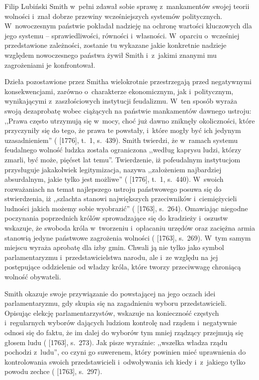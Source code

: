 \begin{artplenv}{Filip Lubiński}
Smith w~pełni zdawał sobie sprawę z~mankamentów swojej teorii wolności i~znał dobrze przewiny wcześniejszych
systemów politycznych. W~nowoczesnym państwie pokładał nadzieję na ochronę wartości kluczowych dla jego
systemu -- sprawiedliwości, równości i~własności. W~oparciu o~wcześniej przedstawione zależności, zostanie tu wykazane jakie
konkretnie nadzieje względem nowoczesnego państwa żywił Smith i~z~jakimi znanymi mu zagrożeniami je konfrontował.

Dzieła pozostawione przez Smitha wielokrotnie przestrzegają przed negatywnymi konsekwencjami, zarówno o~charakterze
ekonomicznym, jak i~politycznym, wynikającymi z~zaszłościowych instytucji feudalizmu. W~ten sposób wyraża swoją
dezaprobatę wobec ciążących na państwie mankamentów dawnego ustroju: ,,Prawa często utrzymują się w~mocy, choć już dawno
zniknęły okoliczności, które przyczyniły się do tego, że prawa te powstały, i~które mogły być ich jedynym
uzasadnieniem''
(\cite{smith_badania_2007} [1776], t.~1, s.~439).
Smith twierdzi, że w~ramach systemu
feudalnego wolność ludzka została ograniczona ,,według kaprysu ludzi, którzy zmarli, być może, pięćset lat temu''.
Twierdzenie, iż pofeudalnym instytucjom przysługuje jakakolwiek legitymizacja, nazywa ,,założeniem najbardziej
absurdalnym, jakie tylko jest możliwe''
(\cite{smith_badania_2007} [1776], t.~1, s.~440).
W~swoich
rozważaniach na temat najlepszego ustroju państwowego posuwa się do stwierdzenia, iż ,,szlachta stanowi największych
przeciwników i~ciemiężycieli ludności jakich możemy sobie wyobrazić''
(\cite{smith_lectures_1982} [1763], s.~264).
Omawiając niegodne poczynania poprzednich królów sprowadzające się do kradzieży i~oszustw wskazuje, że swoboda
króla w~tworzeniu i~opłacaniu urzędów oraz zaciężna armia stanowią jedyne państwowe zagrożenia wolności
(\cite{smith_lectures_1982} [1763], s.~269).
W~tym samym miejscu wyraża aprobatę dla izby gmin. Chwali ją nie
tylko jako symbol parlamentaryzmu i~przedstawicielstwa narodu, ale i~ze względu na jej postępujące oddzielenie od
władzy króla, które tworzy przeciwwagę chroniącą wolność obywateli.

Smith okazuje swoje przywiązanie do powstającej na jego oczach idei parlamentaryzmu, gdy skupia się na zagadnieniu
wyboru przedstawicieli. Opisując elekcję parlamentarzystów, wskazuje na konieczność częstych i~regularnych wyborów
dających ludziom kontrolę nad rządem i~negatywnie odnosi się do faktu, że im dalej do wyborów tym mniej rządzący
przejmują się głosem ludu
(\cite{smith_lectures_1982} [1763], s.~273).
Jak pisze wyraźnie: ,,wszelka władza
rządu pochodzi z~ludu'', co czyni go suwerenem, który powinien mieć uprawnienia do kontrolowania swoich przedstawicieli
i~odwoływania ich kiedy i~z~jakiego tylko powodu zechce
(\cite{smith_lectures_1982} [1763], s.~297).


\end{artplenv}
